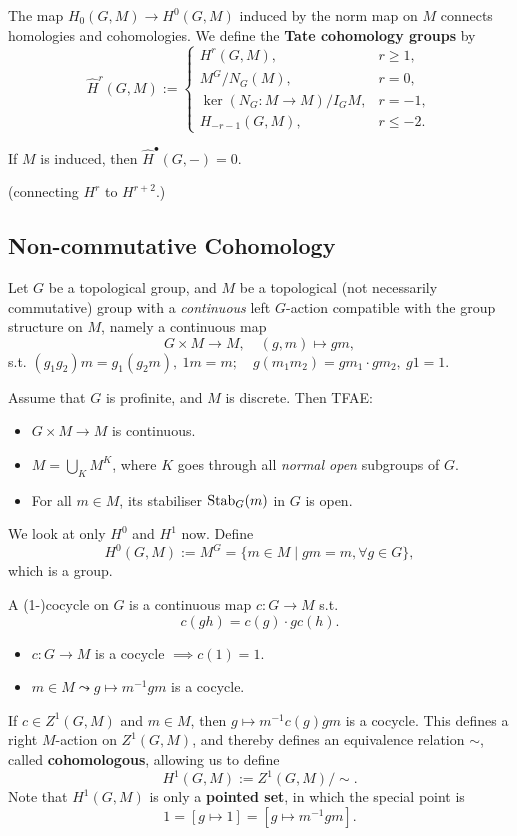 The map $H_0(G, M)\to H^0(G, M)$ induced by the norm map on $M$ connects homologies and cohomologies. We define the \textbf{Tate cohomology groups} by \[\hat H^r (G, M) := \begin{cases}
    H^r(G, M), &r\ge 1,\\
    M^G/N_G(M), &r = 0,\\
    \ker (N_G : M\to M)/I_GM, & r = -1,\\
    H_{-r-1} (G, M), & r\le -2.
\end{cases}\]

\begin{proposition}
    If $M$ is induced, then $\hat H^\bullet(G, -) = 0$.
\end{proposition}

(connecting $H^r$ to $H^{r + 2}$.)






\subsection{Non-commutative Cohomology}
Let $G$ be a topological group, and $M$ be a topological (not necessarily commutative) group with a \textit{continuous} left $G$-action compatible with the group structure on $M$, namely a continuous map\[G\times M\to M,\quad (g, m)\mapsto gm,\]
s.t. \(
    (g_1g_2)m = g_1(g_2m),\ 1m = m;\quad
    g(m_1m_2) = gm_1\cdot gm_2,\ g1 = 1.
\)
\begin{remark}
    Assume that $G$ is profinite, and $M$ is discrete. Then TFAE:\begin{itemize}
    \item $G\times M\to M$ is continuous.
    \item $M = \bigcup_{K} M^K$, where $K$ goes through all \textit{normal open} subgroups of $G$.
    \item For all $m\in M$, its stabiliser $\operatorname{Stab}_G(m)$ in $G$ is open.
    \end{itemize}
\end{remark}

We look at only $H^0$ and $H^1$ now.
Define \[H^0(G, M) := M^G = \{m\in M\mid gm = m,\forall g\in G\},\]
which is a group.

A (1-)cocycle on $G$ is a continuous map $c : G\to M$ s.t. \[c(gh) = c(g)\cdot gc(h).\]
\begin{itemize}
\item $c : G\to M$ is a cocycle $\implies c(1) = 1$.
\item $m\in M\leadsto g\mapsto m^{-1}gm$ is a cocycle.
\end{itemize}
If $c\in Z^1(G,M)$ and $m\in M$,
then $g\mapsto m^{-1}c(g)gm$ is a cocycle.
This defines a right $M$-action on $Z^1(G, M)$,
and thereby defines an equivalence relation $\sim$, called \textbf{cohomologous}, allowing us to define \[H^1(G, M) := Z^1(G, M)/\!\sim.\]
Note that $H^1(G, M)$ is only a \textbf{pointed set},
in which the special point is \[1 = [g\mapsto 1] = [g\mapsto m^{-1}gm].\]

